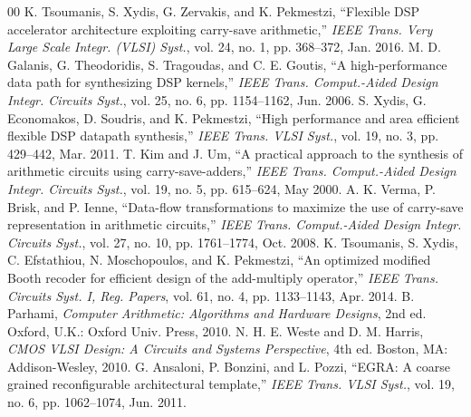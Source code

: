 \documentclass[conference]{IEEEtran}
\begin{document}
\begin{thebibliography}{00}
 K. Tsoumanis, S. Xydis, G. Zervakis, and K. Pekmestzi, ``Flexible DSP accelerator architecture exploiting carry-save arithmetic,'' \textit{IEEE Trans. Very Large Scale Integr. (VLSI) Syst.}, vol. 24, no. 1, pp. 368--372, Jan. 2016.
 M. D. Galanis, G. Theodoridis, S. Tragoudas, and C. E. Goutis, ``A high-performance data path for synthesizing DSP kernels,'' \textit{IEEE Trans. Comput.-Aided Design Integr. Circuits Syst.}, vol. 25, no. 6, pp. 1154--1162, Jun. 2006.
 S. Xydis, G. Economakos, D. Soudris, and K. Pekmestzi, ``High performance and area efficient flexible DSP datapath synthesis,'' \textit{IEEE Trans. VLSI Syst.}, vol. 19, no. 3, pp. 429--442, Mar. 2011.
 T. Kim and J. Um, ``A practical approach to the synthesis of arithmetic circuits using carry-save-adders,'' \textit{IEEE Trans. Comput.-Aided Design Integr. Circuits Syst.}, vol. 19, no. 5, pp. 615--624, May 2000.
 A. K. Verma, P. Brisk, and P. Ienne, ``Data-flow transformations to maximize the use of carry-save representation in arithmetic circuits,'' \textit{IEEE Trans. Comput.-Aided Design Integr. Circuits Syst.}, vol. 27, no. 10, pp. 1761--1774, Oct. 2008.
 K. Tsoumanis, S. Xydis, C. Efstathiou, N. Moschopoulos, and K. Pekmestzi, ``An optimized modified Booth recoder for efficient design of the add-multiply operator,'' \textit{IEEE Trans. Circuits Syst. I, Reg. Papers}, vol. 61, no. 4, pp. 1133--1143, Apr. 2014.
 B. Parhami, \textit{Computer Arithmetic: Algorithms and Hardware Designs}, 2nd ed. Oxford, U.K.: Oxford Univ. Press, 2010.
 N. H. E. Weste and D. M. Harris, \textit{CMOS VLSI Design: A Circuits and Systems Perspective}, 4th ed. Boston, MA: Addison-Wesley, 2010.
 G. Ansaloni, P. Bonzini, and L. Pozzi, ``EGRA: A coarse grained reconfigurable architectural template,'' \textit{IEEE Trans. VLSI Syst.}, vol. 19, no. 6, pp. 1062--1074, Jun. 2011.
\end{thebibliography}
\end{document}
